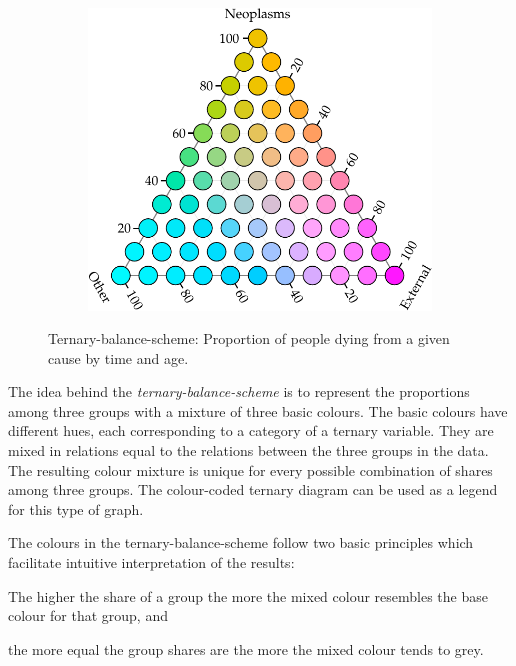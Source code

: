 \documentclass[a4paper, 12pt]{scrartcl}
\begin{document}
\begin{figure}[!htb]
\begin{subfigure}[t]{0.65\textwidth}
  \label{fig:tbsplot}
  \end{subfigure}%
  ~
  \begin{subfigure}[t]{0.35\textwidth}
  \includegraphics[width = \linewidth]{../fig/plot-tern_balance_lgnd.pdf}
  \label{fig:tbslegend1}
  \end{subfigure}%
  \caption{Ternary-balance-scheme: Proportion of people dying from a given cause by time and age.}
  \label{fig:tbs}
\end{figure}

The idea behind the \emph{ternary-balance-scheme} is to represent the proportions among three groups with a mixture of three basic colours. The basic colours have different hues, each corresponding to a category of a ternary variable. They are mixed in relations equal to the relations between the three groups in the data. The resulting colour mixture is unique for every possible combination of shares among three groups. The colour-coded ternary diagram can be used as a legend for this type of graph.

The colours in the ternary-balance-scheme follow two basic principles which facilitate intuitive interpretation of the results:

\begin{compactenum}
  \item The higher the share of a group the more the mixed colour resembles the base colour for that group, and
  \item the more equal the group shares are the more the mixed colour tends to grey.
\end{compactenum}
\end{document}
